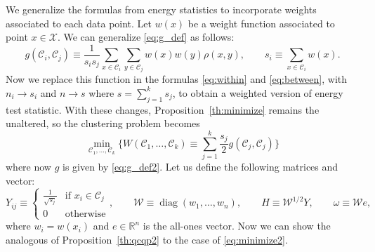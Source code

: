 \documentclass[aps,preprint,nofootinbib,floatfix]{revtex4-1}
\DeclareMathOperator{\diag}{diag}
\newcommand\C{{\mathcal{C}}}
\newcommand\e{e}
\newcommand\om{\omega}
\begin{document}
We generalize the formulas from energy statistics to incorporate
weights associated to each data point.
Let $w(x)$ be a weight function associated to point $x \in \mathcal{X}$.
We can generalize \eqref{eq:g_def} as follows:
\begin{equation}
\label{eq:g_def2}
g(\C_i, \C_j) \equiv \dfrac{1}{s_i s_j} \sum_{x\in \C_i}\sum_{y\in\C_j}
w(x)w(y) \rho(x,y), \qquad s_i \equiv \sum_{x\in\C_i} w(x).
\end{equation}
Now we replace this function in the formulas \eqref{eq:within} and
\eqref{eq:between}, with 
$n_i \to s_i$ and $n \to s$ where $s = \sum_{j=1}^k s_j$,
to obtain a weighted version of energy test statistic. With these
changes, Proposition~\ref{th:minimize} remains the unaltered, so the
clustering problem becomes
\begin{equation}
\label{eq:minimize2}
\min_{\C_1, \dotsc, \C_k} 
\bigg\{
W(\C_1,\dotsc,\C_k) \equiv \sum_{j=1}^k \dfrac{s_j}{2} g(\C_j,\C_j)
\bigg\}
\end{equation}
where now $g$ is given by \eqref{eq:g_def2}. 
Let us define the following matrices and vector:
\begin{equation}
\label{eq:weighted_matrices}
Y_{ij} \equiv \begin{cases}
\tfrac{1}{\sqrt{s_j}} & \mbox{if $x_i \in \C_j$} \\
0 & \mbox{otherwise}
\end{cases}, \qquad
\mathcal{W} \equiv \diag(w_1,\dotsc,w_n), \qquad
H \equiv \mathcal{W}^{1/2} Y, \qquad
\om \equiv \mathcal{W} \e,
\end{equation}
where $w_i = w(x_i)$ and $\e \in \mathbb{R}^n$ is the all-ones
vector. Now we can show the analogous of
Proposition~\ref{th:qcqp2} to the case of \eqref{eq:minimize2}.
\end{document}
